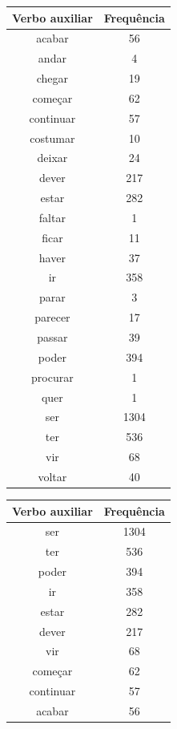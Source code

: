 \documentclass[output=paper,colorlinks,citecolor=brown]{langscibook}
\begin{document}
	\begin{table}[]
		\parbox{.45\linewidth}{
			\centering
			\begin{tabular}{|c|c|}
				\hline
				\textbf{Verbo auxiliar} & \textbf{Frequência} \\\hline
				acabar & 56\\\hline
				andar & 4\\\hline
				chegar & 19\\\hline
				começar & 62\\\hline
				continuar & 57\\\hline
				costumar & 10\\\hline
				deixar & 24\\\hline
				dever & 217\\\hline
				estar & 282\\\hline
				faltar & 1\\\hline
				ficar & 11\\\hline
				haver & 37\\\hline
				ir & 358\\\hline
				parar & 3\\\hline
				parecer & 17\\\hline
				passar & 39\\\hline
				poder & 394\\\hline
				procurar & 1\\\hline
				quer & 1\\\hline
				ser & 1304\\\hline
				ter & 536\\\hline
				vir & 68\\\hline
				voltar & 40\\\hline
			\end{tabular}
		}
		\hfill
		\parbox{.45\linewidth}{
			\centering
			\begin{tabular}{|c|c|}
				\hline
				\textbf{Verbo auxiliar} & \textbf{Frequência} \\\hline
				ser & 1304\\\hline
				ter & 536\\\hline
				poder & 394\\\hline
				ir & 358\\\hline
				estar & 282\\\hline
				dever & 217\\\hline
				vir & 68\\\hline
				começar & 62\\\hline
				continuar & 57\\\hline
				acabar & 56\\\hline

\end{tabular}}
\end{table}
\end{document}
